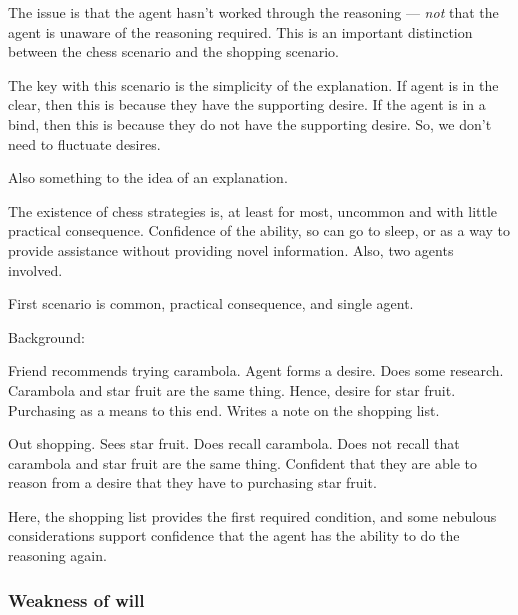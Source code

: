 \documentclass[10pt]{article}
\begin{document}
\begin{note}
   The issue is that the agent hasn't worked through the reasoning --- \emph{not} that the agent is unaware of the reasoning required.
  This is an important distinction between the chess scenario and the shopping scenario.
\end{note}

\begin{note}
  The key with this scenario is the simplicity of the explanation.
  If agent is in the clear, then this is because they have the supporting desire.
  If the agent is in a bind, then this is because they do not have the supporting desire.
  So, we don't need to fluctuate desires.

  Also something to the idea of an explanation.
\end{note}

The existence of chess strategies is, at least for most, uncommon and with little practical consequence.
Confidence of the ability, so can go to sleep, or as a way to provide assistance without providing novel information.
Also, two agents involved.

First scenario is common, practical consequence, and single agent.


\begin{scenario}[Shopping]

  Background:

  Friend recommends trying carambola.
  Agent forms a desire.
  Does some research.
  Carambola and star fruit are the same thing.
  Hence, desire for star fruit.
  Purchasing as a means to this end.
  Writes a note on the shopping list.

  Out shopping.
  Sees star fruit.
  Does recall carambola.
  Does not recall that carambola and star fruit are the same thing.
  Confident that they are able to reason from a desire that they have to purchasing star fruit.
\end{scenario}

\begin{note}
  Here, the shopping list provides the first required condition, and some nebulous considerations support confidence that the agent has the ability to do the reasoning again.
\end{note}




\subsubsection{Weakness of will}
\label{sec:weakness-will}
\end{document}
